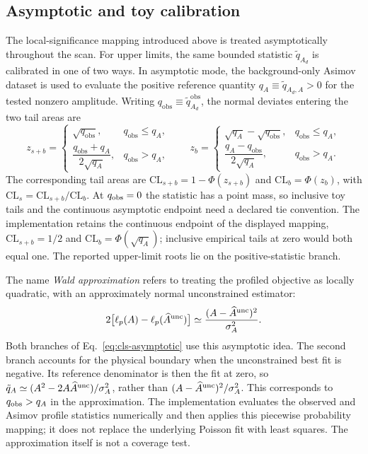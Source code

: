 \subsection{Asymptotic and toy calibration}

The local-significance mapping introduced above is treated asymptotically throughout
the scan. For upper limits, the same bounded statistic
$\tilde q_{A_d}$ is calibrated in one of two ways. In asymptotic mode, the
background-only Asimov dataset is used to evaluate the positive reference quantity
$q_A\equiv\tilde q_{A_d,A}>0$ for the tested nonzero amplitude. Writing
$q_{\mathrm{obs}}\equiv\tilde q_{A_d}^{\mathrm{obs}}$, the normal deviates entering
the two tail areas are
\begin{equation}
z_{s+b}=
\begin{cases}
\sqrt{q_{\mathrm{obs}}}, & q_{\mathrm{obs}}\le q_A,\\[2pt]
\dfrac{q_{\mathrm{obs}}+q_A}{2\sqrt{q_A}}, & q_{\mathrm{obs}}>q_A,
\end{cases}
\qquad
z_b=
\begin{cases}
\sqrt{q_A}-\sqrt{q_{\mathrm{obs}}}, & q_{\mathrm{obs}}\le q_A,\\[2pt]
\dfrac{q_A-q_{\mathrm{obs}}}{2\sqrt{q_A}}, & q_{\mathrm{obs}}>q_A.
\end{cases}
\label{eq:cls-asymptotic}
\end{equation}
The corresponding tail areas are
$\mathrm{CL}_{s+b}=1-\Phi(z_{s+b})$ and $\mathrm{CL}_b=\Phi(z_b)$, with
$\mathrm{CL}_s=\mathrm{CL}_{s+b}/\mathrm{CL}_b$.
At $q_{\rm obs}=0$ the statistic has a point mass, so inclusive toy tails
and the continuous asymptotic endpoint need a declared tie convention.
The implementation retains the continuous endpoint of the displayed
mapping, $\mathrm{CL}_{s+b}=1/2$ and $\mathrm{CL}_b=\Phi(\sqrt{q_A})$;
inclusive empirical tails at zero would both equal one. The reported
upper-limit roots lie on the positive-statistic branch.

The name \emph{Wald approximation} refers to treating the profiled objective
as locally quadratic, with an approximately normal unconstrained estimator:
\begin{equation}
 2\bigl[\ell_p(A)-\ell_p(\widehat A^{\rm unc})\bigr]
 \simeq\frac{(A-\widehat A^{\rm unc})^2}{\sigma_A^2}.
 \label{eq:v501-wald}
\end{equation}
Both branches of Eq.~\eqref{eq:cls-asymptotic} use this asymptotic idea. The
second branch accounts for the physical boundary when the unconstrained
best fit is negative. Its reference denominator is then the fit at zero,
so $\tilde q_A\simeq(A^2-2A\widehat A^{\rm unc})/\sigma_A^2$, rather than
$(A-\widehat A^{\rm unc})^2/\sigma_A^2$. This corresponds to
$q_{\rm obs}>q_A$ in the approximation. The implementation evaluates the
observed and Asimov profile statistics numerically and then applies this
piecewise probability mapping; it does not replace the underlying Poisson
fit with least squares. The approximation itself is not a coverage test.

